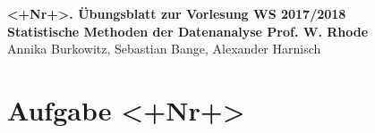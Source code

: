 \documentclass[a4paper, 11pt]{article}
\begin{document}
\noindent
\large{\textbf{<+Nr+>. Übungsblatt zur Vorlesung \hfill WS 2017/2018 \\
Statistische Methoden der Datenanalyse \hfill Prof. W. Rhode}} \\
Annika Burkowitz, Sebastian Bange, Alexander Harnisch \\
\noindent\makebox[\linewidth]{\rule{\textwidth}{0.4pt}}

\section*{Aufgabe <+Nr+>}
\end{document}
